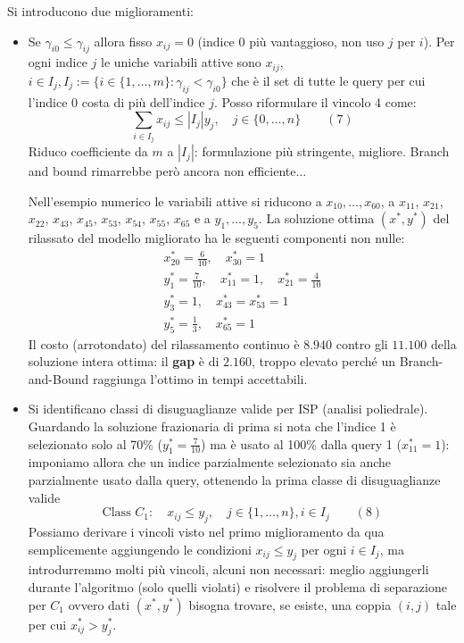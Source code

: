 Si introducono due miglioramenti:
\begin{itemize}
	\item Se $\gamma_{i0}\le \gamma_{ij}$ allora fisso $x_{ij}=0$ (indice 0 più vantaggioso, non uso $j$ per $i$). Per ogni indice $j$ le uniche variabili attive sono $x_{ij}$, $i\in I_j, I_j:=\{i\in\{1,\dots,m\}:\gamma_{ij}<\gamma_{i0}\}$ che è il set di tutte le query per cui l'indice 0 costa di più dell'indice $j$. Posso riformulare il vincolo 4 come:
	\begin{equation*}
		\sum_{i\in I_j}x_{ij}\le |I_j|y_j,\quad j\in \{0,\dots, n\} \qquad (7)
	\end{equation*}
	Riduco coefficiente da $m$ a $|I_j|$: formulazione più stringente, migliore. Branch and bound rimarrebbe però ancora non efficiente...

	Nell'esempio numerico le variabili attive si riducono a $x_{10},\dots,x_{60}$, a $x_{11}$, $x_{21}$, $x_{22}$, $x_{43}$, $x_{45}$, $x_{53}$, $x_{54}$, $x_{55}$, $x_{65}$ e a $y_1,\dots,y_5$. La soluzione ottima $(x^*,y^*)$ del rilassato del modello migliorato ha le seguenti componenti non nulle:
	\begin{equation*}
		\begin{aligned}
			x_{20}^*=\tfrac{6}{10},\quad x_{30}^*=1\\
			y_1^*=\tfrac{7}{10},\quad x_{11}^*=1,\quad x_{21}^*=\tfrac{4}{10}\\
			y_3^*=1,\quad x_{43}^*=x_{53}^*=1\\
			y_5^*=\tfrac{1}{3},\quad x_{65}^*=1
		\end{aligned}
	\end{equation*}
	Il costo (arrotondato) del rilassamento continuo è $8.940$ contro gli $11.100$ della soluzione intera ottima: il \textbf{gap} è di $2.160$, troppo elevato perché un Branch-and-Bound raggiunga l'ottimo in tempi accettabili.
	\item Si identificano classi di disuguaglianze valide per ISP (analisi poliedrale). Guardando la soluzione frazionaria di prima si nota che l'indice 1 è selezionato solo al 70\% ($y_1^*=\frac{7}{10}$) ma è usato al 100\% dalla query 1 ($x_{11}^*=1$): imponiamo allora che un indice parzialmente selezionato sia anche parzialmente usato dalla query, ottenendo la prima classe di disuguaglianze valide
	\begin{equation*}
		\textrm{Class } C_1:\quad x_{ij}\le y_j,\quad j\in \{1,\dots, n\}, i\in I_j \qquad (8)
	\end{equation*}
	Possiamo derivare i vincoli visto nel primo miglioramento da qua semplicemente aggiungendo le condizioni $x_{ij}\le y_j$ per ogni $i\in I_j$, ma introdurremmo molti più vincoli, alcuni non necessari: meglio aggiungerli durante l'algoritmo (solo quelli violati) e risolvere il problema di separazione per $C_1$ ovvero dati $(x^*,y^*)$ bisogna trovare, se esiste, una coppia $(i,j)$ tale per cui $x_{ij}^*>y_j^*$.
	

\end{itemize}
